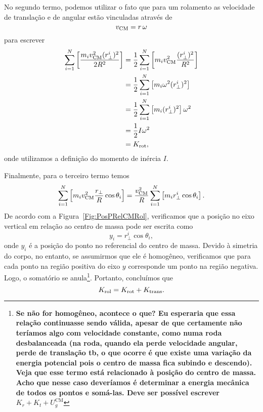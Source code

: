 No segundo termo, podemos utilizar o fato que para um rolamento as velocidade de translação e de angular estão vinculadas através de
\begin{equation}
    v_{\rm{CM}} = r\,\omega
\end{equation}
%
para escrever
\begin{align}
    \sum_{i=1}^N \left[\frac{m_i v_{\rm{CM}}^2 (r_\perp^i)^2}{2R^2} \right] &= \frac{1}{2} \sum_{i=1}^N \left[m_i v_{\rm{CM}}^2 \frac{(r_\perp^i)^2}{R^2} \right] \\
    &= \frac{1}{2} \sum_{i=1}^N \left[m_i \omega^2 (r_\perp^i)^2 \right] \\
    &= \frac{1}{2} \sum_{i=1}^N \left[m_i (r_\perp^i)^2 \right] \omega^2 \\
    &= \frac{1}{2} I \omega^2 \\
    &= K_{\rm{rot}},
\end{align}
%
onde utilizamos a definição do momento de inércia $I$.

Finalmente, para o terceiro termo temos
\begin{equation}
    \sum_{i=1}^N \left[m_i v_{\rm{CM}}^2 \frac{r_\perp}{R}\cos\theta_i\right] =  \frac{v_{\rm{CM}}^2}{R}\sum_{i=1}^N \left[m_i r_\perp^i \cos\theta_i\right].
\end{equation}
%
De acordo com a Figura~\ref{Fig:PosPRelCMRol}, verificamos que a posição no eixo vertical em relação ao centro de massa pode ser escrita como
\begin{equation}
    y_i = r_\perp^i \cos\theta_i,
\end{equation}
%
onde $y_i$ é a posição do ponto no referencial do centro de massa. Devido à simetria do corpo, no entanto, se assumirmos que ele é homogêneo, verificamos que para cada ponto na região positiva do eixo $y$ corresponde um ponto na região negativa. Logo, o somatório se anula\footnote{\textbf{Se não for homogêneo, acontece o que? Eu esperaria que essa relação continuasse sendo válida, apesar de que certamente não teríamos algo com velocidade constante, como numa roda desbalanceada (na roda, quando ela perde velocidade angular, perde de translação tb, o que ocorre é que existe uma variação da energia potencial pois o centro de massa fica subindo e descendo). Veja que esse termo está relacionado à posição do centro de massa. Acho que nesse caso deveríamos é determinar a energia mecânica de todos os pontos e somá-las. Deve ser possível escrever $K_r + K_t + U_g^{\textrm{CM}}$}}. Portanto, concluímos que
\begin{equation}
    K_{\rm{rol}} = K_{\rm{rot}} + K_{\rm{trans}}.
\end{equation}

